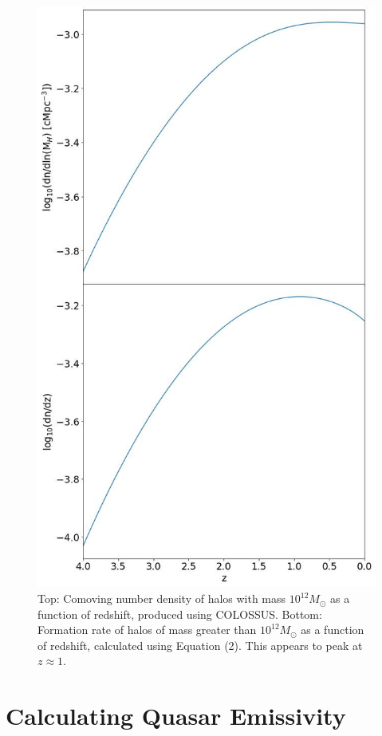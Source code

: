 \documentclass[12pt, twocolumn]{report}%
\begin{document}
\begin{figure}[H]
\centering
\includegraphics[width=12.5cm]{Plot_6.jpeg}
\caption{Top: Comoving number density of halos with mass $10^{12}M_\odot$ as a function of redshift, produced using COLOSSUS. Bottom: Formation rate of halos of mass greater than $10^{12}M_\odot$ as a function of redshift, calculated using Equation (2). This appears to peak at $z\approx1$.}
\label{fig:6}
\end{figure}
\newpage
\twocolumngrid


\section{Calculating Quasar Emissivity}
\end{document}

